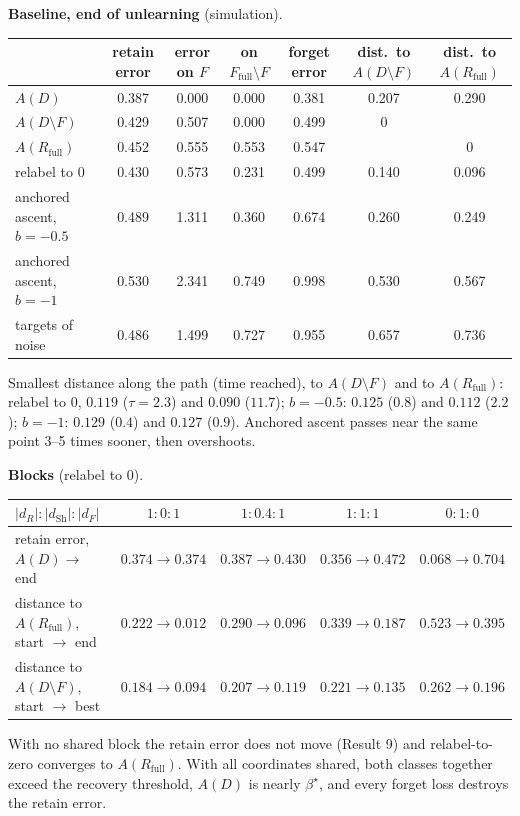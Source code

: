 \documentclass[10pt]{article}
\newcommand{\Rf}{R_{\mathrm{full}}}\newcommand{\Ff}{F_{\mathrm{full}}}\newcommand{\dSh}{d_{\mathrm{Sh}}}
\begin{document}
\textbf{Baseline, end of unlearning} (simulation).
\begin{center}\small\begin{tabular}{@{}lcccccc@{}}\toprule
& retain error & error on $F$ & on $\Ff\setminus F$ & forget error & dist.\ to $A(D\setminus F)$ & dist.\ to $A(\Rf)$\\\midrule
$A(D)$ & 0.387 & 0.000 & 0.000 & 0.381 & 0.207 & 0.290\\
$A(D\setminus F)$ & 0.429 & 0.507 & 0.000 & 0.499 & 0 & \\
$A(\Rf)$ & 0.452 & 0.555 & 0.553 & 0.547 & & 0\\\midrule
relabel to $0$ & 0.430 & 0.573 & 0.231 & 0.499 & 0.140 & 0.096\\
anchored ascent, $b=-0.5$ & 0.489 & 1.311 & 0.360 & 0.674 & 0.260 & 0.249\\
anchored ascent, $b=-1$ & 0.530 & 2.341 & 0.749 & 0.998 & 0.530 & 0.567\\
targets of noise & 0.486 & 1.499 & 0.727 & 0.955 & 0.657 & 0.736\\\bottomrule
\end{tabular}\end{center}
Smallest distance along the path (time reached), to $A(D\setminus F)$ and to $A(\Rf)$: relabel to $0$, $0.119$ ($\tau=2.3$) and $0.090$ ($11.7$); $b=-0.5$: $0.125$ ($0.8$) and $0.112$ ($2.2$); $b=-1$: $0.129$ ($0.4$) and $0.127$ ($0.9$). Anchored ascent passes near the same point 3--5 times sooner, then overshoots.

\textbf{Blocks} (relabel to $0$).
\begin{center}\small\begin{tabular}{@{}lcccc@{}}\toprule
$|d_R|:|\dSh|:|d_F|$ & $1:0:1$ & $1:0.4:1$ & $1:1:1$ & $0:1:0$\\\midrule
retain error, $A(D)\to$ end & $0.374\to0.374$ & $0.387\to0.430$ & $0.356\to0.472$ & $0.068\to0.704$\\
distance to $A(\Rf)$, start $\to$ end & $0.222\to0.012$ & $0.290\to0.096$ & $0.339\to0.187$ & $0.523\to0.395$\\
distance to $A(D\setminus F)$, start $\to$ best & $0.184\to0.094$ & $0.207\to0.119$ & $0.221\to0.135$ & $0.262\to0.196$\\\bottomrule
\end{tabular}\end{center}
With no shared block the retain error does not move (Result 9) and relabel-to-zero converges to $A(\Rf)$. With all coordinates shared, both classes together exceed the recovery threshold, $A(D)$ is nearly $\beta^\star$, and every forget loss destroys the retain error.
\end{document}
